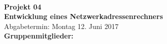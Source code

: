 \begin{titlepage}

\begin{center}

\Large{\titel}\\[12ex]

\huge{\textbf{Projekt 04}}\\[1.5ex]
\Large{\textbf{Entwicklung eines Netzwerkadressenrechners}}\\[4ex]

\normalsize
Abgabetermin: Montag 12. Juni 2017\\[3em]
\textbf{Gruppenmitglieder:}\\
\autoren \\[5ex]

\end{center}

\end{titlepage}